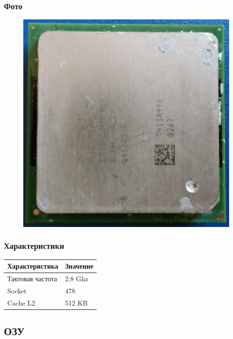 \documentclass[a4paper]{article}
\begin{document}
\subsubsection{Фото}
\begin{figure}[H]
\centering
\includegraphics[scale=0.1]{cpu.jpg} 
\end{figure}

\subsubsection{Характеристики}
\begin{table}[H]
\centering
\begin{tabular}{|l|l|}
    \hline
    Характеристика & Значение \\
    \hline
    Тактовая частота & 2.8 Ghz \\
    Socket & 478 \\ 
    Cache L2 & 512 KB \\
    \hline
\end{tabular}
\end{table}

\subsection{ОЗУ}
\end{document}
